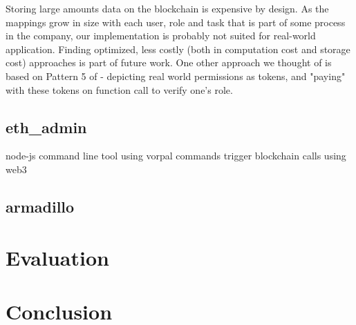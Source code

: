 \documentclass[runningheads]{llncs}
\begin{document}
Storing large amounts data on the blockchain is expensive by design.
As the mappings grow in size with each user, role and task that is part of some process in the company, our implementation is probably not suited for real-world application.
Finding optimized, less costly (both in computation cost and storage cost) approaches is part of future work.
One other approach we thought of is based on Pattern 5 of \cite{xu2018pattern} - depicting real world permissions as tokens, and "paying" with these tokens on function call to verify one's role.

\subsection{eth\_admin}

node-js command line tool using vorpal
commands trigger blockchain calls using web3

\subsection{armadillo}

\section{Evaluation}


\section{Conclusion}
\end{document}
